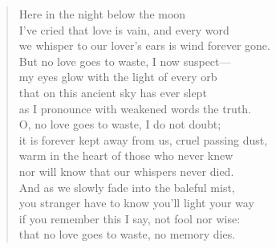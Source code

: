 \documentclass[a4paper, 12pt]{article}
\begin{document}
\begin{verse}
    
Here in the night below the moon\\
I’ve cried that love is vain, and every word\\
we whisper to our lover’s ears is wind forever gone.\\
But no love goes to waste, I now suspect—\\
my eyes glow with the light of every orb\\
that on this ancient sky has ever slept\\
as I pronounce with weakened words the truth.\\
O, no love goes to waste, I do not doubt;\\
it is forever kept away from us, cruel passing dust,\\
warm in the heart of those who never knew\\
nor will know that our whispers never died.\\
And as we slowly fade into the baleful mist,\\
you stranger have to know you’ll light your way\\
if you remember this I say, not fool nor wise:\\
that no love goes to waste, no memory dies.\\
\end{verse}
\end{document}
